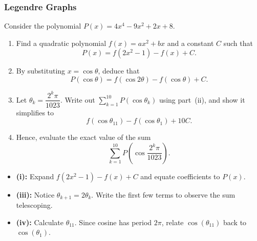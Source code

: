 \subsubsection*{Legendre Graphs}
\begin{center}
\end{center}

\begin{problem}
Consider the polynomial $P(x) = 4x^4 - 9x^2 + 2x + 8$.

\begin{enumerate}[label=(\roman*)]
  \item Find a quadratic polynomial $f(x) = ax^2 + bx$ and a constant $C$ such that
  \[
    P(x) = f(2x^2 - 1) - f(x) + C.
  \]
  \item By substituting $x = \cos\theta$, deduce that
  \[
    P(\cos\theta) = f(\cos 2\theta) - f(\cos\theta) + C.
  \]
  \item Let $\theta_k = \dfrac{2^k\pi}{1023}$. Write out $\displaystyle\sum_{k=1}^{10} P(\cos\theta_k)$ using part~(ii), and show it simplifies to
  \[
    f(\cos\theta_{11}) - f(\cos\theta_1) + 10C.
  \]
  \item Hence, evaluate the exact value of the sum
  \[
    \sum_{k=1}^{10} P\!\left(\cos\frac{2^k\pi}{1023}\right).
  \]
\end{enumerate}
\end{problem}

\begin{hintbox}
\begin{itemize}[leftmargin=*]
  \item \textbf{(i):} Expand $f(2x^2 - 1) - f(x) + C$ and equate coefficients to $P(x)$.
  \item \textbf{(iii):} Notice $\theta_{k+1} = 2\theta_k$. Write the first few terms to observe the sum telescoping.
  \item \textbf{(iv):} Calculate $\theta_{11}$. Since cosine has period $2\pi$, relate $\cos(\theta_{11})$ back to $\cos(\theta_1)$.
\end{itemize}
\end{hintbox}

